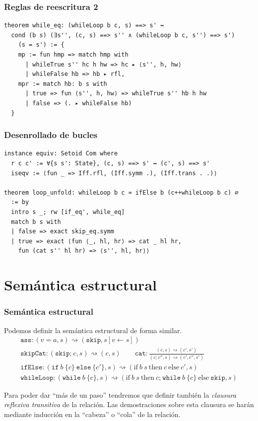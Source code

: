 \documentclass[9pt]{beamer}
\newcommand{\funfont}[1]{\texttt{#1}}
\newcommand{\ImpIfElse}[3]{\texttt{if} \ {#1} \ \{{#2}\} \ \texttt{else} \ \{{#3}\}}
\newcommand{\ImpWhile}[2]{\texttt{while} \ {#1} \ \{{#2}\}}
\newcommand{\ImpConcat}[2]{{#1} \texttt{;} \ {#2}}
\newcommand{\ImpSkip}{\texttt{skip}}
\newcommand{\ImpAssign}[2]{{#1} = {#2}}
\newcommand{\LeanIfElse}[3]{\text{if} \ {#1} \ \text{then} \ {#2} \ \text{else} \ {#3}}
\begin{document}
\begin{frame}[fragile]
\frametitle{Reglas de reescritura 2}

\begin{verbatim}
theorem while_eq: (whileLoop b c, s) ==> s' ↔
  cond (b s) (∃s'', (c, s) ==> s'' ∧ (whileLoop b c, s'') ==> s') 
    (s = s') := {
    mp := fun hmp => match hmp with
      | whileTrue s'' hc h hw => hc ▸ ⟨s'', h, hw⟩
      | whileFalse hb => hb ▸ rfl,
    mpr := match hb: b s with
      | true => fun ⟨s'', h, hw⟩ => whileTrue s'' hb h hw
      | false => (. ▸ whileFalse hb)
  }
\end{verbatim}

\end{frame}

\begin{frame}[fragile]
\frametitle{Desenrollado de bucles}

\begin{verbatim}
instance equiv: Setoid Com where
  r c c' := ∀{s s': State}, (c, s) ==> s' ↔ (c', s) ==> s'
  iseqv := ⟨fun _ => Iff.rfl, (Iff.symm .), (Iff.trans . .)⟩

theorem loop_unfold: whileLoop b c ≈ ifElse b (c++whileLoop b c) ∅ 
  := by
  intro s _; rw [if_eq', while_eq]
  match b s with
  | false => exact skip_eq.symm
  | true => exact ⟨fun ⟨_, hl, hr⟩ => cat _ hl hr,
    fun (cat s'' hl hr) => ⟨s'', hl, hr⟩⟩
\end{verbatim}

\end{frame}

\section{Semántica estructural}

\begin{frame}
\frametitle{Semántica estructural}

Podemos definir la semántica estructural de forma similar.
\[
\begin{gathered}
  \funfont{ass}: (\ImpAssign{v}{a}, s) \rightsquigarrow (\ImpSkip, s[v \leftarrow s]) \\
  \funfont{skipCat}: (\ImpConcat{\ImpSkip}{c}, s) \rightsquigarrow (c, s) \qquad
  \funfont{cat}: \frac{(c, s) \rightsquigarrow (c', s')}{(\ImpConcat{c}{c''}, s) \rightsquigarrow (c', c'', s')} \\
  \funfont{ifElse}: (\ImpIfElse{b}{c}{c'}, s)
    \rightsquigarrow (\LeanIfElse{b \ s}{c}{c'}, s) \\
  \funfont{whileLoop}: (\ImpWhile{b}{c}, s)
    \rightsquigarrow (\LeanIfElse{b \ s}{\ImpConcat{c}{\ImpWhile{b}{c}}}{\ImpSkip}, s) 
\end{gathered}
\]

Para poder dar \enquote{más de un paso} tendremos que definir también la 
\emph{clausura reflexiva transitiva} de la relación. Las demostraciones
sobre esta clausura se harán mediante inducción en la \enquote{cabeza} o
\enquote{cola} de la relación.

\end{frame}
\end{document}
